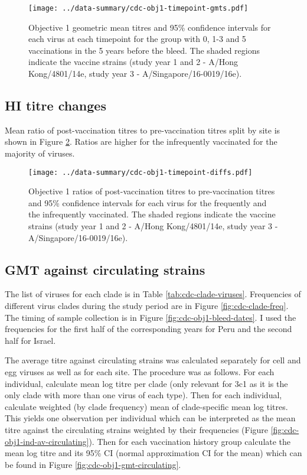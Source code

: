 \documentclass[12pt]{article}
\begin{document}
\begin{figure}
	\texttt{[image: ../data-summary/cdc-obj1-timepoint-gmts.pdf]}
	\caption{Objective 1 geometric mean titres and 95\% confidence intervals for each virus at each timepoint for the group with 0, 1-3 and 5 vaccinations in the 5 years before the bleed. The shaded regions indicate the vaccine strains (study year 1 and 2 - A/Hong Kong/4801/14e, study year 3 - A/Singapore/16-0019/16e).}
	\label{fig:cdc-obj1-timepoint-gmts}
\end{figure}

\subsection{HI titre changes}

Mean ratio of post-vaccination titres to pre-vaccination titres split by site is shown in Figure
\ref{fig:cdc-obj1-timepoint-diffs}. Ratios are higher for the infrequently
vaccinated for the majority of viruses.

\begin{figure}
	\texttt{[image: ../data-summary/cdc-obj1-timepoint-diffs.pdf]}
	\caption{Objective 1 ratios of post-vaccination titres to pre-vaccination titres and 95\% confidence intervals for each virus for the frequently and the infrequently vaccinated. The shaded regions indicate the vaccine strains (study year 1 and 2 - A/Hong Kong/4801/14e, study year 3 - A/Singapore/16-0019/16e).}
	\label{fig:cdc-obj1-timepoint-diffs}
\end{figure}

\subsection{GMT against circulating strains}

The list of viruses for each clade is in Table \ref{tab:cdc-clade-viruses}. Frequencies of different virus clades during the study period are in Figure \ref{fig:cdc-clade-freq}. The timing of sample collection is in Figure \ref{fig:cdc-obj1-bleed-dates}. I used the frequencies for the first half of the corresponding years for Peru and the second half for Israel.

The average titre against circulating strains was calculated separately for cell and egg viruses as well as for each site. The procedure was as follows. For each individual, calculate mean log titre per clade (only relevant for 3c1 as it is the only clade with more than one virus of each type). Then for each individual, calculate weighted (by clade frequency) mean of clade-specific mean log titres. This yields one observation per individual which can be interpreted as the mean titre against the circulating strains weighted by their frequencies (Figure \ref{fig:cdc-obj1-ind-av-circulating}). Then for each vaccination history group calculate the mean log titre and its 95\% CI (normal approximation CI for the mean) which can be found in Figure \ref{fig:cdc-obj1-gmt-circulating}.
\end{document}
